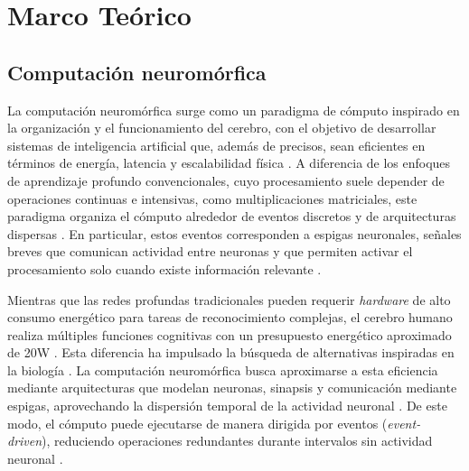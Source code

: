 \chapter{Marco Teórico}

\section{Computación neuromórfica}

La computación neuromórfica surge como un paradigma de cómputo inspirado en la organización y el funcionamiento del cerebro, con el objetivo de desarrollar sistemas de inteligencia artificial que, además de precisos, sean eficientes en términos de energía, latencia y escalabilidad física \cite{malcolm2023comprehensivereviewspikingneural, Choi2025}. A diferencia de los enfoques de aprendizaje profundo convencionales, cuyo procesamiento suele depender de operaciones continuas e intensivas, como multiplicaciones matriciales, este paradigma organiza el cómputo alrededor de eventos discretos y de arquitecturas dispersas \cite{Yao2024neuromorphicchip, yan2026reconsideringenergyefficiencyspiking}. En particular, estos eventos corresponden a espigas neuronales, señales breves que comunican actividad entre neuronas y que permiten activar el procesamiento solo cuando existe información relevante \cite{Wunderlich2021EventProp}.

Mientras que las redes profundas tradicionales pueden requerir \textit{hardware} de alto consumo energético para tareas de reconocimiento complejas, el cerebro humano realiza múltiples funciones cognitivas con un presupuesto energético aproximado de 20W \cite{Clarke1999}. Esta diferencia ha impulsado la búsqueda de alternativas inspiradas en la biología \cite{doi:10.1073/pnas.1604850113efficientneuromorphic, Henkes2024snnnonlinearregression}. La computación neuromórfica busca aproximarse a esta eficiencia mediante arquitecturas que modelan neuronas, sinapsis y comunicación mediante espigas, aprovechando la dispersión temporal de la actividad neuronal \cite{Kudithipudi2025Neuromorphiccomputingatscale, Choi2025}. De este modo, el cómputo puede ejecutarse de manera dirigida por eventos (\textit{event-driven}), reduciendo operaciones redundantes durante intervalos sin actividad neuronal \cite{Yao2024neuromorphicchip}.


